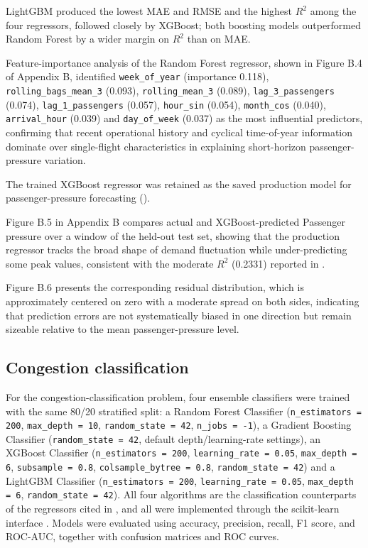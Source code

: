 LightGBM produced the lowest MAE and RMSE and the highest $R^2$ among the
four regressors, followed closely by XGBoost; both boosting models
outperformed Random Forest by a wider margin on $R^2$ than on MAE.

Feature-importance analysis of the Random Forest regressor, shown in
Figure B.4 of Appendix B, identified \nolinkurl{week_of_year}
(importance 0.118), \nolinkurl{rolling_bags_mean_3} (0.093),
\nolinkurl{rolling_mean_3} (0.089), \nolinkurl{lag_3_passengers} (0.074),
\nolinkurl{lag_1_passengers} (0.057), \nolinkurl{hour_sin} (0.054),
\nolinkurl{month_cos} (0.040), \nolinkurl{arrival_hour} (0.039) and
\nolinkurl{day_of_week} (0.037) as the most influential predictors,
confirming that recent operational history and cyclical time-of-year
information dominate over single-flight characteristics in explaining
short-horizon passenger-pressure variation.

The trained XGBoost regressor was retained as the saved production model
for passenger-pressure forecasting
().

Figure B.5 in Appendix B compares actual and XGBoost-predicted Passenger
pressure over a window of the held-out test set, showing that the production
regressor tracks the broad shape of demand fluctuation while under-predicting
some peak values, consistent with the moderate $R^2$ (0.2331) reported in
.

Figure B.6 presents the corresponding residual distribution, which is
approximately centered on zero with a moderate spread on both sides,
indicating that prediction errors are not systematically biased in one
direction but remain sizeable relative to the mean passenger-pressure level.

\subsection{Congestion classification}
\label{subsec:congestion-classification}

For the congestion-classification problem, four ensemble classifiers were trained with the same 80/20 stratified split: a Random Forest Classifier (\texttt{n\_estimators = 200}, \texttt{max\_depth = 10}, \texttt{random\_state = 42}, \texttt{n\_jobs = -1}), a Gradient Boosting Classifier (\texttt{random\_state = 42}, default depth/learning-rate settings), an XGBoost Classifier (\texttt{n\_estimators = 200}, \texttt{learning\_rate = 0.05}, \texttt{max\_depth = 6}, \texttt{subsample = 0.8}, \nolinkurl{colsample_bytree}~\texttt{= 0.8}, \texttt{random\_state = 42}) and a LightGBM Classifier (\texttt{n\_estimators = 200}, \texttt{learning\_rate = 0.05}, \texttt{max\_depth = 6}, \texttt{random\_state = 42}). All four algorithms are the classification counterparts of the regressors cited in  \parencite{breiman2001random,friedman2001greedy,chen2016xgboost,ke2017lightgbm}, and all were implemented through the scikit-learn interface \parencite{pedregosa2011scikitlearn}. Models were evaluated using accuracy, precision, recall, F1 score, and ROC-AUC, together with confusion matrices and ROC curves.

